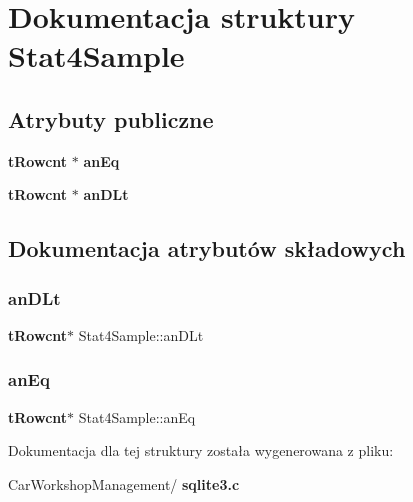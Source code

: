 \section{Dokumentacja struktury Stat4\+Sample}
\label{struct_stat4_sample}
\subsection*{Atrybuty publiczne}
\begin{DoxyCompactItemize}
\item 
\textbf{ t\+Rowcnt} $\ast$ \textbf{ an\+Eq}
\item 
\textbf{ t\+Rowcnt} $\ast$ \textbf{ an\+D\+Lt}
\end{DoxyCompactItemize}


\subsection{Dokumentacja atrybutów składowych}
\mbox{\label{struct_stat4_sample_a25519389bab21052bf80af8500388a37}} 
\subsubsection{anDLt}
{\footnotesize\ttfamily \textbf{ t\+Rowcnt}$\ast$ Stat4\+Sample\+::an\+D\+Lt}

\mbox{\label{struct_stat4_sample_a8dd17556ec12614fbf4b88ab0bc82749}} 
\subsubsection{anEq}
{\footnotesize\ttfamily \textbf{ t\+Rowcnt}$\ast$ Stat4\+Sample\+::an\+Eq}



Dokumentacja dla tej struktury została wygenerowana z pliku\+:\begin{DoxyCompactItemize}
\item 
Car\+Workshop\+Management/\textbf{ sqlite3.\+c}\end{DoxyCompactItemize}
